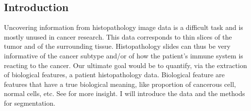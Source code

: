 \documentclass[a0,portrait]{a0poster}
\begin{document}
\vspace{1cm} %


\begin{multicols}{2} %


\color{Navy} %

\section*{Introduction}

Uncovering information from histopathology image data is a difficult task and is mostly unused in cancer research. This data corresponds to thin slices of the tumor and of the surrounding tissue. Histopathology slides can thus be very informative of the cancer subtype and/or of how the patient's immune system is reacting to the cancer. Our ultimate goal would be to quantify, via the extraction of biological features, a patient histopathology data. Biological feature are features that have a true biological meaning, like proportion of cancerous cell, normal cells, etc. See \cite{yuan2012quantitative} for more insight. I will introduce the data and the methods for segmentation.






\end{multicols}
\end{document}
